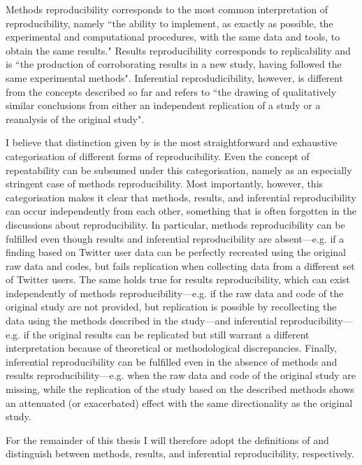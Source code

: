 \documentclass[11pt, a4paper,twoside]{report}\usepackage[]{graphicx}\usepackage[]{color}
\begin{document}
Methods reproducibility corresponds to the most common interpretation of reproducibility, namely ``the ability to implement, as exactly as possible, the experimental and computational procedures, with the same data and tools, to obtain the same results." Results reproducibility corresponds to replicability and is ``the production of corroborating results in a new study, having followed the same experimental methods". Inferential reprodudicibility, however, is different from the concepts described so far and refers to ``the drawing of qualitatively similar conclusions from either an independent replication of a study or a reanalysis of the original study".

I believe that distinction given by \cite{goodman_what_2016} is the most straightforward and exhaustive categorisation of different forms of reproducibility. Even the concept of repeatability can be subsumed under this categorisation, namely as an especially stringent case of methods reproducibility. Most importantly, however, this categorisation makes it clear that methods, results, and inferential reproducibility can occur independently from each other, something that is often forgotten in the discussions about reproducibility. In particular, methods reproducibility can be fulfilled even though results and inferential reproducibility are absent---e.g. if a finding based on Twitter user data can be perfectly recreated using the original raw data and codes, but fails replication when collecting data from a different set of Twitter users. The same holds true for results reproducibility, which can exist independently of methods reproducibility---e.g. if the raw data and code of the original study are not provided, but replication is possible by recollecting the data using the methods described in the study---and inferential reproducibility---e.g. if the original results can be replicated but still warrant a different interpretation because of theoretical or methodological discrepancies. Finally, inferential reproducibility can be fulfilled even in the absence of methods and results reproducibility---e.g. when the raw data and code of the original study are missing, while the replication of the study based on the described methods shows an attenuated (or exacerbated) effect with the same directionality as the original study.

For the remainder of this thesis I will therefore adopt the definitions of \cite{goodman_what_2016} and distinguish between methods, results, and inferential reproducibility, respectively.
\end{document}
